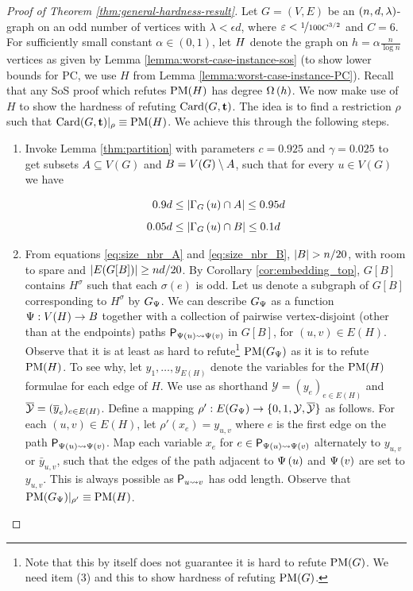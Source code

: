 \documentclass[11pt]{article}
\begin{document}
\begin{proof}[Proof of Theorem \ref{thm:general-hardness-result}]
Let $G=(V,E)$ be an $\EnDeeLambda$-graph on an odd number of vertices with $\lambda < \epsilon d$, where $\epsilon < \nicefrac{1}{100C^{3/2}}$ and $C=6$. 
For sufficiently small constant $\alpha \in (0,1)$, let $\HardInstance$ denote the graph on $h=\alpha\frac{n}{\log n}$ vertices as given by Lemma \ref{lemma:worst-case-instance-sos} (to show lower bounds for PC, we use $H$ from Lemma \ref{lemma:worst-case-instance-PC}). Recall that any SoS proof which refutes $\PM{H}$ has degree $\BigOmega{h}$. We now make use of $H$ to show the hardness of refuting $\Card{G, \vec{t}}$. The idea is to find a restriction $\rho$ such that $\Card{G, \vec{t}}|_\rho \equiv \PM{H}$. We achieve this through the following steps.

\begin{enumerate}
\item{Invoke Lemma  \ref{thm:partition} with parameters $c=0.925$ and $\gamma = 0.025$ to get subsets $A \subseteq V(G)$ and $B = \Vertices{G} \setminus A$, such that for every $u \in V(G)$ we have
    
\begin{align} 
0.9d  &\leq   \Size{\Neighbourhood{G}{u} \cap \RedA} \leq 0.95d \label{eq:size_nbr_A}\\[5pt]
0.05d  &\leq   \Size{\Neighbourhood{G}{u} \cap \GreenB} \leq 0.1d 
\label{eq:size_nbr_B}
\end{align}
}

\item{From equations \eqref{eq:size_nbr_A} and \eqref{eq:size_nbr_B}, $\Size{B} > n/20$, with room to spare and $\Size{E(G[B])} \ge nd/20$.
    By Corollary \ref{cor:embedding_top}, $G[B]$ contains $H^{\sigma}$ such that each $\sigma(e)$ is odd. Let us denote a subgraph of $G[B]$ corresponding to $H^{\sigma}$ by $G_{\EmbeddingFunc}$.
    We can describe $G_\EmbeddingFunc$ as a function $\EmbeddingFunc: V(H) \to B$ together with a collection of pairwise vertex-disjoint (other than at the endpoints) paths  $\Path{\Embedding{u}}{\Embedding{v}}$ in $G[B]$, for $(u,v) \in E(H)$.
    Observe that it is at least as hard to refute\footnote{Note that this by itself does not guarantee it is hard to refute $\PM{G}$. We need item (3) and this to show hardness of refuting $\PM{G}$.} $\PM{G_{\EmbeddingFunc}}$ as it is to refute $\PM{H}$.
To see why, let $y_1, \dots, y_{E(H)}$ denote the variables for the $\PM{H}$ formulae for each edge of $H$.
We use as shorthand $\mathcal{Y} = (y_e)_{e \in E(H)}$ and $\Complement{\mathcal{Y}} = (\Complement{y}_e)_{e \in E(H)}$.
Define a mapping $\rho': \Edges{G_\EmbeddingFunc} \to \{0,1, \mathcal{Y}, \Complement{\mathcal{Y}} \}$ as follows. For each $(u,v) \in E(H)$, let $\rho'(x_e) = y_{u,v}$ where $e$ is the first edge on the path $\Path{\Embedding{u}}{\Embedding{v}}$.
Map each variable $x_e$ for $e \in \Path{\Embedding{u}}{\Embedding{v}}$ alternately to $y_{u,v}$ or $\bar{y}_{u,v}$, such that the edges of the path adjacent to $\Embedding{u}$ and $\Embedding{v}$ are set to $y_{u,v}$. This is always possible as $\Path{u}{v}$ has odd length. Observe that $\PM{G_\EmbeddingFunc}|_{\rho'} \equiv \PM{H}$. 
  }


\end{enumerate}
\end{proof}
\end{document}
